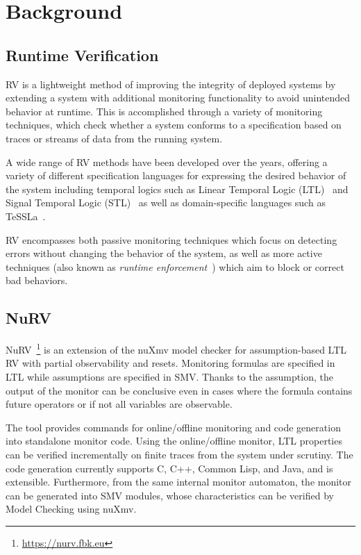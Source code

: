 \section{Background}\label{sec:background}

\subsection{Runtime Verification}
RV is a lightweight method of improving the integrity of deployed systems by extending a system with additional monitoring functionality to avoid unintended behavior at runtime.
This is accomplished through a variety of monitoring techniques, which check whether a system conforms to a specification based on traces or streams of data from the running system.

A wide range of RV methods have been developed over the years, offering a variety of different specification languages for expressing the desired behavior of the system including temporal logics such as Linear Temporal Logic (LTL)~\cite{pnueli1977ltl} and Signal Temporal Logic (STL)~\cite{donze2013stl} as well as domain-specific languages such as TeSSLa~\cite{convent2018tessla}.

RV encompasses both passive monitoring techniques which focus on detecting errors without changing the behavior of the system, as well as more active techniques (also known as \emph{runtime enforcement}~\cite{falcone2010runtimeenforcement}) which aim to block or correct bad behaviors.

\subsection{NuRV}

NuRV~\cite{CimattiTT19a}\footnote{\url{https://nurv.fbk.eu}} is an extension of the nuXmv model checker for assumption-based LTL RV with partial observability and resets. Monitoring formulas are specified in LTL while assumptions are specified in SMV. Thanks to the assumption, the output of the monitor can be conclusive even in cases where the formula contains future operators or if not all variables are observable.

The tool provides commands for online/offline monitoring and code generation into standalone monitor code. Using the online/offline monitor, LTL properties can be verified incrementally on finite traces from the system under scrutiny. The code generation currently supports C, C++, Common Lisp, and Java, and is extensible. Furthermore, from the same internal monitor automaton, the monitor can be generated into SMV modules, whose characteristics can be verified by Model Checking using nuXmv.

